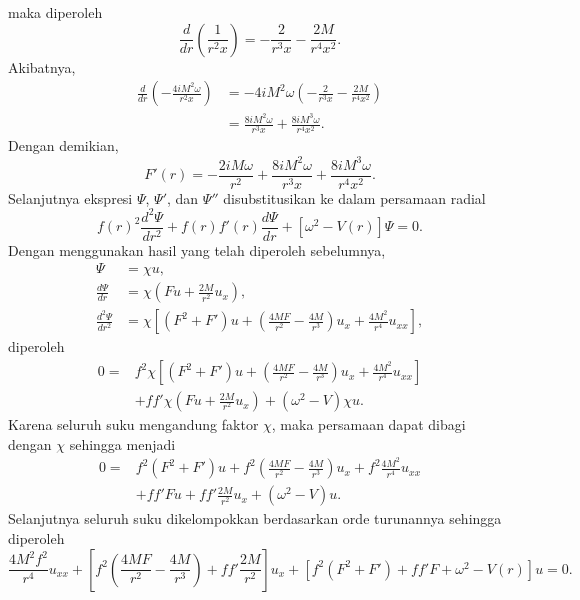 maka diperoleh
\begin{equation}
    \frac{d}{dr} \left( \frac{1}{r^2x} \right) = -\frac{2}{r^3x} - \frac{2M}{r^4x^2}.
\end{equation}
Akibatnya,
\begin{align}
    \frac{d}{dr} \left( -\frac{4iM^2\omega}{r^2x} \right) &= -4iM^2\omega \left( -\frac{2}{r^3x} - \frac{2M}{r^4x^2} \right) \nonumber\\
    &= \frac{8iM^2\omega}{r^3x} + \frac{8iM^3\omega}{r^4x^2}.
\end{align}
Dengan demikian,
\begin{equation}
    \boxed{ F'(r) = -\frac{2iM\omega}{r^2} + \frac{8iM^2\omega}{r^3x} + \frac{8iM^3\omega}{r^4x^2}. }
\end{equation}
Selanjutnya ekspresi $\Psi$, $\Psi'$, dan $\Psi''$ disubstitusikan ke dalam persamaan radial
\begin{equation}
    f(r)^2\frac{d^2\Psi}{dr^2} + f(r)f'(r)\frac{d\Psi}{dr} + \left[ \omega^2 - V(r) \right] \Psi =0.
\end{equation}
Dengan menggunakan hasil yang telah diperoleh sebelumnya,
\begin{align}
    \Psi &= \chi u,\\
    \frac{d\Psi}{dr} &= \chi \left( Fu + \frac{2M}{r^2}u_x \right),\\
    \frac{d^2\Psi}{dr^2} &= \chi \left[ (F^2+F')u + \left( \frac{4MF}{r^2} - \frac{4M}{r^3} \right)u_x + \frac{4M^2}{r^4}u_{xx} \right],
\end{align}
diperoleh
\begin{align}
    0={}& f^2\chi \left[ (F^2+F')u + \left( \frac{4MF}{r^2} - \frac{4M}{r^3} \right)u_x + \frac{4M^2}{r^4}u_{xx} \right] \nonumber\\
    & + ff'\chi \left( Fu + \frac{2M}{r^2}u_x \right) + (\omega^2-V)\chi u.
\end{align}
Karena seluruh suku mengandung faktor $\chi$, maka persamaan dapat dibagi dengan $\chi$ sehingga menjadi
\begin{align}
    0={}& f^2(F^2+F')u + f^2 \left( \frac{4MF}{r^2} - \frac{4M}{r^3} \right)u_x + f^2 \frac{4M^2}{r^4}u_{xx} \nonumber\\
    & + ff'Fu + ff' \frac{2M}{r^2}u_x + (\omega^2-V)u.
\end{align}
Selanjutnya seluruh suku dikelompokkan berdasarkan orde turunannya sehingga diperoleh
\begin{equation}
    \boxed{ \frac{4M^2f^2}{r^4}u_{xx} + \left[ f^2 \left( \frac{4MF}{r^2} - \frac{4M}{r^3} \right) + ff' \frac{2M}{r^2} \right]u_x + \left[ f^2(F^2+F') + ff'F + \omega^2 - V(r) \right]u = 0. }
\end{equation}
